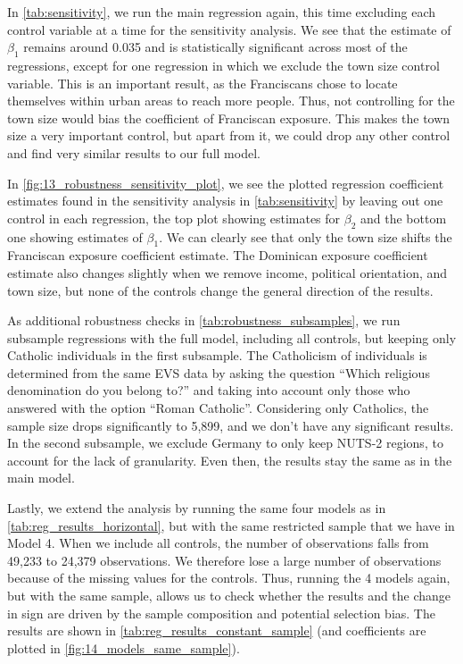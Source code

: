 \documentclass[12pt, a4paper]{article}
\begin{document}
In \autoref{tab:sensitivity}, we run the main regression again, this time excluding each control variable at a time for the 
sensitivity analysis. We see that the estimate of $\beta_1$ remains around 0.035 and is statistically significant 
across most of the regressions, except for one regression in which we exclude the town size control variable. 
This is an important result, as the Franciscans chose to locate themselves within urban areas to reach more people. 
Thus, not controlling for the town size would bias the coefficient of Franciscan 
exposure. This makes the town size a very important control, but apart from it, we could drop any other control and 
find very similar results to our full model.

In \autoref{fig:13_robustness_sensitivity_plot}, we see the plotted regression coefficient estimates found in the sensitivity analysis in \autoref{tab:sensitivity} 
by leaving out one control in each regression, the top plot showing estimates for $\beta_2$ and the bottom one showing 
estimates of $\beta_1$. We can clearly see that only the town size shifts the Franciscan exposure coefficient estimate. 
The Dominican exposure coefficient estimate also changes slightly when we remove income, political orientation, 
and town size, but none of the controls change the general direction of the results. 

As additional robustness checks in \autoref{tab:robustness_subsamples}, we run subsample regressions with the full model, including all controls, 
but keeping only Catholic individuals in the first subsample. The Catholicism of individuals is determined from the 
same EVS data by asking the question ``Which religious denomination do you belong to?'' and taking into account only 
those who answered with the option ``Roman Catholic''. Considering only Catholics, the sample size drops significantly 
to 5,899, and we don’t have any significant results. In the second subsample, we exclude Germany to only keep NUTS-2 regions, 
to account for the lack of granularity. Even then, the results stay the same as in the main model. 

Lastly, we extend the analysis by running the same four models as in \autoref{tab:reg_results_horizontal}, but with 
the same restricted sample that we have in Model 4. When we include all controls, the number of 
observations falls from 49,233 to 24,379 observations. We therefore lose a large number 
of observations because of the missing values for the controls. Thus, running the 4 models again, but with the same sample, 
allows us to check whether the results and the change in sign are driven by the sample composition and potential 
selection bias. The results are shown in \autoref{tab:reg_results_constant_sample} (and coefficients are plotted in \autoref{fig:14_models_same_sample}).
\end{document}
